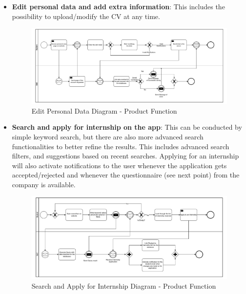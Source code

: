 \begin{itemize}
      \item \textbf{Edit personal data and add extra information}: This includes the possibility to upload/modify the
            CV at any time.

            \begin{figure}[H]
                  \centering
                  \includegraphics[width=1.0\textwidth]{Images/BPMN_3.pdf}
                  \caption{Edit Personal Data Diagram - Product Function}
                  \label{fig:edit_personal_data_diagram}
            \end{figure}

      \item \textbf{Search and apply for internship on the app}: This can be conducted by simple keyword search, but
            there are also more advanced search functionalities to better refine the results. This includes advanced
            search filters, and suggestions based on recent searches. Applying for an internship will also activate
            notifications to the user whenever the application gets accepted/rejected and whenever the questionnaire
            (see next point) from the company is available.

            \begin{figure}[H]
                  \centering
                  \includegraphics[width=1.0\textwidth]{Images/BPMN_4.pdf}
                  \caption{Search and Apply for Internship Diagram - Product Function}
                  \label{fig:search_and_apply_for_internship_diagram}
            \end{figure}


\end{itemize}

